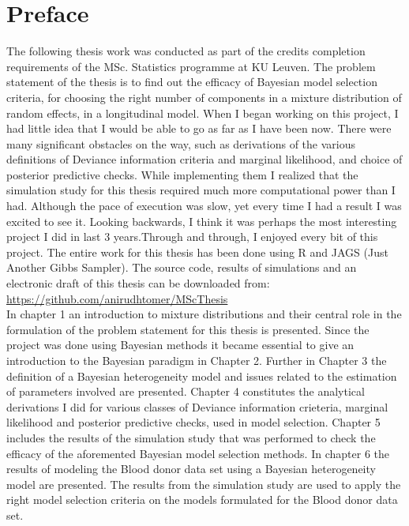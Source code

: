 
\chapter{Preface}
\label{ch : preface}

The following thesis work was conducted as part of the credits completion requirements of the MSc. Statistics programme at KU Leuven. The problem statement of the thesis is to find out the efficacy of Bayesian model selection criteria, for choosing the right number of components in a mixture distribution of random effects, in a longitudinal model. When I began working on this project, I had little idea that I would be able to go as far as I have been now. There were many significant obstacles on the way, such as derivations of the various definitions of Deviance information criteria and marginal likelihood, and choice of posterior predictive checks. While implementing them I realized that the simulation study for this thesis required much more computational power than I had. Although the pace of execution was slow, yet every time I had a result I was excited to see it. Looking backwards, I think it was perhaps the most interesting project I did in last 3 years.Through and through, I enjoyed every bit of this project. The entire work for this thesis has been done using R and JAGS (Just Another Gibbs Sampler). The source code, results of simulations and an electronic draft of this thesis can be downloaded from:\\
\url{https://github.com/anirudhtomer/MScThesis}\\

In chapter 1 an introduction to mixture distributions and their central role in the formulation of the problem statement for this thesis is presented. Since the project was done using Bayesian methods it became essential to give an introduction to the Bayesian paradigm in Chapter 2. Further in Chapter 3 the definition of a Bayesian heterogeneity model and issues related to the estimation of parameters involved are presented. Chapter 4 constitutes the analytical derivations I did for various classes of Deviance information crieteria, marginal likelihood and posterior predictive checks, used in model selection. Chapter 5 includes the results of the simulation study that was performed to check the efficacy of the aforemented Bayesian model selection methods. In chapter 6 the results of modeling the Blood donor data set \citep{nasserinejad_prevalence_2015} using a Bayesian heterogeneity model are presented. The results from the simulation study are used to apply the right model selection criteria on the models formulated for the Blood donor data set.\\

